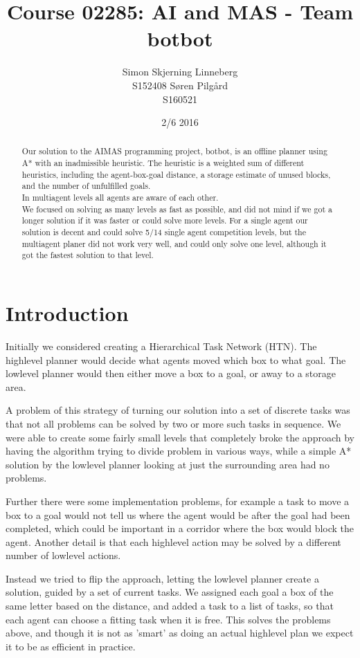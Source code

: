 \documentclass[letterpaper]{article}
\title{Course 02285: AI and MAS - Team botbot}
\author{Simon Skjerning Linneberg\\ S152408 \And Søren Pilgård\\ S160521}
\date{2/6 2016}
\begin{document}
\maketitle

\begin{abstract}
Our solution to the AIMAS programming project, botbot, is an offline planner using A*
with an inadmissible heuristic. The heuristic is a weighted sum of different heuristics,
including the agent-box-goal distance, a storage estimate of unused blocks, and
the number of unfulfilled goals.\\

In multiagent levels all agents are aware of each other.\\

We focused on solving as many levels as fast as possible, and did not mind if we
got a longer solution if it was faster or could solve more levels. For a single
agent our solution is decent and could solve 5/14 single agent competition levels,
but the multiagent planer did not work very well, and could only solve one level,
although it got the fastest solution to that level.
\end{abstract}

\section{Introduction}
Initially we considered creating a Hierarchical Task Network (HTN). The highlevel
planner would decide what agents moved which box to what goal. The lowlevel planner
would then either move a box to a goal, or away to a storage area.

A problem of this strategy of turning our solution into a set of discrete
tasks was that not all problems can be solved by two or more such tasks in
sequence. We were able to create some fairly small levels that completely broke the
approach by having the algorithm trying to divide problem in various ways, while
a simple A* solution by the lowlevel planner looking at just the surrounding area had no problems.

Further there were some implementation problems, for example a task to move a box to a goal
would not tell us where the agent would be after the goal had been completed, which
could be important in a corridor where the box would block the agent. Another detail
is that each  highlevel action may be solved by a different number of lowlevel actions.

Instead we tried to flip the approach, letting the lowlevel planner create a
solution, guided by a set of current tasks. We assigned each goal a box of the
same letter based on the distance, and added a task to a list of tasks, so that
each agent can choose a fitting task when it is free. This solves the problems
above, and though it is not as 'smart' as doing an actual highlevel plan we
expect it to be as efficient in practice.\\
\end{document}
